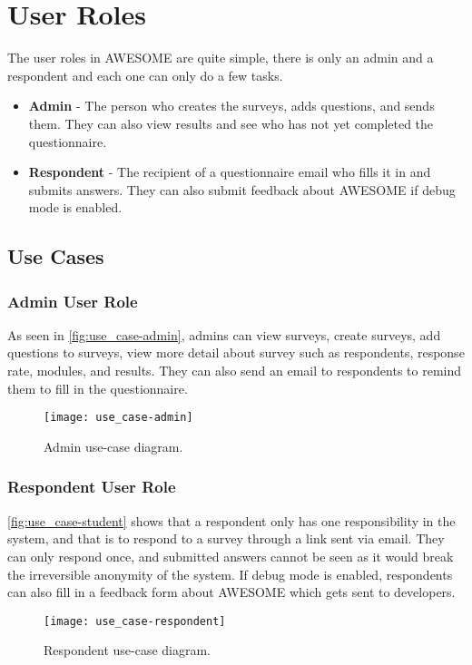 	\section{User Roles}
	
	The user roles in \ac{AWESOME} are quite simple, there is only an admin and a respondent and each one can only do a few tasks.
	
	\begin{itemize}
		\item \textbf{Admin} - The person who creates the surveys, adds questions, and sends them. They can also view results and see who has not yet completed the questionnaire.
		\item \textbf{Respondent} - The recipient of a questionnaire email who fills it in and submits answers. They can also submit feedback about \ac{AWESOME} if debug mode is enabled.
	\end{itemize}
	
	\subsection{Use Cases}
	
	\subsubsection{Admin User Role}
	
	As seen in \autoref{fig:use_case-admin}, admins can view surveys, create surveys, add questions to surveys, view more detail about survey such as respondents, response rate, modules, and results.
	They can also send an email to respondents to remind them to fill in the questionnaire.

	
	\begin{figure}[H]
		\texttt{[image: use\_case-admin]}
		\caption{Admin use-case diagram.}
		\label{fig:use_case-admin}
	\end{figure}
		
	\newpage
	
	\subsubsection{Respondent User Role}
	
	\autoref{fig:use_case-student} shows that a respondent only has one responsibility in the system, and that is to respond to a survey through a link sent via email.
	They can only respond once, and submitted answers cannot be seen as it would break the irreversible anonymity of the system.
	If debug mode is enabled, respondents can also fill in a feedback form about \ac{AWESOME} which gets sent to developers.
	
	\begin{figure}[H]
		\texttt{[image: use\_case-respondent]}
		\caption{Respondent use-case diagram.}
		\label{fig:use_case-student}
	\end{figure}